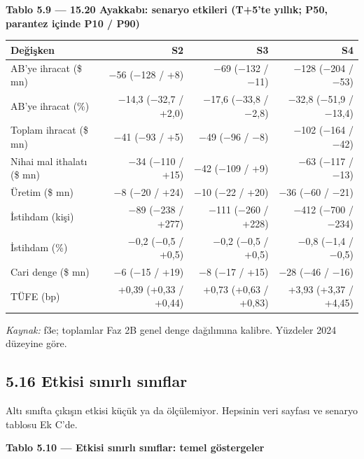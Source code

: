 \textbf{Tablo 5.9 --- 15.20 Ayakkabı: senaryo etkileri (T+5'te yıllık; P50, parantez içinde P10 / P90)}

\nopagebreak[4]

\begingroup\gbtablo\small

\begin{longtable}[]{@{}lrrr@{}}
\toprule\noalign{}
\textbf{Değişken} & \textbf{S2} & \textbf{S3} & \textbf{S4} \\
\midrule\noalign{}
\endhead
\bottomrule\noalign{}
\endlastfoot
AB'ye ihracat (\$ mn) & −56 (−128 / +8) & −69 (−132 / −11) & −128 (−204 / −53) \\
AB'ye ihracat (\%) & −14,3 (−32,7 / +2,0) & −17,6 (−33,8 / −2,8) & −32,8 (−51,9 / −13,4) \\
Toplam ihracat (\$ mn) & −41 (−93 / +5) & −49 (−96 / −8) & −102 (−164 / −42) \\
Nihai mal ithalatı (\$ mn) & −34 (−110 / +15) & −42 (−109 / +9) & −63 (−117 / −13) \\
Üretim (\$ mn) & −8 (−20 / +24) & −10 (−22 / +20) & −36 (−60 / −21) \\
İstihdam (kişi) & −89 (−238 / +277) & −111 (−260 / +228) & −412 (−700 / −234) \\
İstihdam (\%) & −0,2 (−0,5 / +0,5) & −0,2 (−0,5 / +0,5) & −0,8 (−1,4 / −0,5) \\
Cari denge (\$ mn) & −6 (−15 / +19) & −8 (−17 / +15) & −28 (−46 / −16) \\
TÜFE (bp) & +0,39 (+0,33 / +0,44) & +0,73 (+0,63 / +0,83) & +3,93 (+3,37 / +4,45) \\
\end{longtable}

\endgroup

\emph{Kaynak:} \etiketT{} f3e; toplamlar Faz 2B genel denge dağılımına kalibre. Yüzdeler 2024 düzeyine göre.

\hypertarget{nace_kartlar_13-15-516-etkisi-sux131nux131rlux131-sux131nux131flar}{%
\subsection{5.16 Etkisi sınırlı sınıflar}\label{nace_kartlar_13-15-516-etkisi-sux131nux131rlux131-sux131nux131flar}}

Altı sınıfta çıkışın etkisi küçük ya da ölçülemiyor. Hepsinin veri sayfası ve senaryo tablosu Ek C'de.


\textbf{Tablo 5.10 --- Etkisi sınırlı sınıflar: temel göstergeler}

